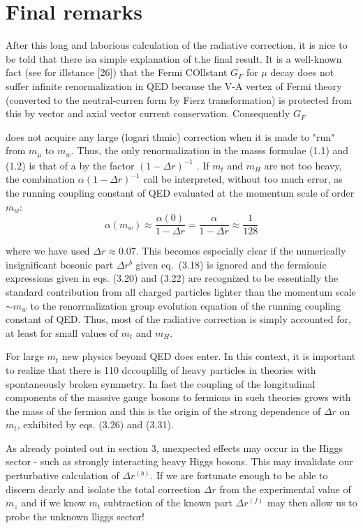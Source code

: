 {\section{Final remarks}

After this long and laborious calculation of the radiative correction, it is nice
to be told that there isa simple explanation of t.he final result. It is a well-known
fact (see for illstance [26]) that the Fermi COllstant $G_{F}$ for $\mu$ decay does not
suffer infinite renormalization in QED because the V-A vertex of Fermi theory
(converted to the neutral-curren form by Fierz transformation) is protected
from this by vector and axial vector current conservation. Consequently $G_{F}$

does not acquire any large (logari thmic) correction when it is made to "run"
from $m_{\mu}$ to $m_{w}$. Thus, the only renormalization in the masss formulae (1.1) and
(1.2) is that of a by the factor $(1- \Delta r)^{-1}$ . If $m_{t}$ and $m_{H}$ are not too heavy, the
combination $\alpha(1- \Delta r)^{-1}$ call be interpreted, without too much error, as the
running coupling constant of QED evaluated at the momentum scale of order
$m_{w}$: 
$$
\alpha(m_{w})\approx \frac{\alpha(0)}{1-\Delta r} = \frac{\alpha}{1-\Delta r} \approx \frac{1}{128}
$$

where we have used $\Delta r \approx 0.07$. This becomes especially clear if the numerically
insignificant bosonic part $\Delta r^{b}$ given eq.~(3.18) is ignored and the fermionic
expressions given in eqs. (3.20) and (3.22) are recognized to be essentially the
standard contribution from all charged particles lighter than the momentum
scale $\sim m_{w}$ to the renorrnalization group evolution equation of the running
coupling constant of QED. Thus, most of the radiative correction is simply
accounted for, at least for small values of $m_{t}$ and $m_{H}$.

For large $m_{t}$ new physics beyond QED does enter. In this context, it is
important to realize that there is 110 dccouplillg of heavy particles in theories
with spontaneously broken symmetry. In faet the coupling of the longitudinal
components of the massive gauge bosons to fermions in sueh theories grows with
the mass of the fermion and this is the origin of the strong dependence of $\Delta r$
on $m_{t}$, exhibited by eqs. (3.26) and (3.31). 

As already pointed out in section 3, unexpected effects may occur in the
Higgs sector - such as strongly interacting heavy Higgs bosons. This may
invalidate our perturbative calculation of $\Delta r^{(b)}$. If we are fortunate enough to be
able to discern dearly and isolate the total correction $\Delta r$ from the experimental
value of $m_{z}$ and if we know $m_{t}$ subtraction of the known part $\Delta r^{(f)}$ may then
allow us to probe the unknown lliggs sector!

}
